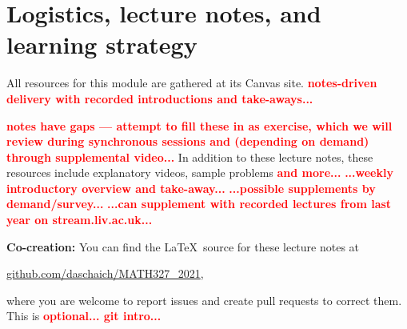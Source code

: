 \documentclass[12 pt]{article}
\newcommand{\mutesection}[1]{\vspace{-\medskipamount}\section*{#1}\vspace{-\medskipamount}}
\newcommand{\TODO}[1]{\textcolor{red}{\textbf{#1}}}
\begin{document}
\mutesection{Logistics, lecture notes, and learning strategy}
All resources for this module are gathered at its Canvas site.
\TODO{notes-driven delivery with recorded introductions and take-aways...}{
\TODO{notes have gaps --- attempt to fill these in as exercise, which we will review during synchronous sessions and (depending on demand) through supplemental video...}
In addition to these lecture notes, these resources include explanatory videos, sample problems \TODO{and more...}
\TODO{...weekly introductory overview and take-away...}
\TODO{...possible supplements by demand/survey...} %
\TODO{...can supplement with recorded lectures from last year on stream.liv.ac.uk...}

\textbf{Co-creation:} You can find the \LaTeX\ source for these lecture notes at \\
\centerline{\href{https://github.com/daschaich/MATH327_2021}{github.com/daschaich/MATH327\_2021},}
where you are welcome to report issues and create pull requests to correct them.
This is \TODO{optional... git intro...}

\begin{comment}
\begin{tabular}{|l|p{12cm}|}
  \hline
  \textbf{Weeks 1--7:}  & We will have \textit{three hours of lecture} and \textit{one tutorial}.
                          There will be question sheets for the tutorials.
                          You will work through part of these questions in your time before the tutorial (non-assessed).
                          Key elements will be discussed in the tutorial. \\[12 pt]
  \hline
  \textbf{Week 8--10:}  & We will have \textit{two hours of lecture} and \textit{two hours Computer Lab}.
                          In the Computer Lab sessions, we will study a statistical phenomenon (see page~\pageref{sec:project}) with a computer experiment using MATLAB.
                          A basic introduction to MATLAB will be provided, but familiarising yourself with MATLAB (if needed) could be beneficial.
                          Support material to get started with MATLAB is provided at the VITAL page for MATH327. \\[12 pt]
  \hline
  \textbf{Week 11--12:} & We will have \textit{three hours of lecture} and \textit{one tutorial}.
                          Both will include exam revision sessions. \\[12 pt]
  \hline
\end{tabular}
\end{comment}



}
\end{document}
